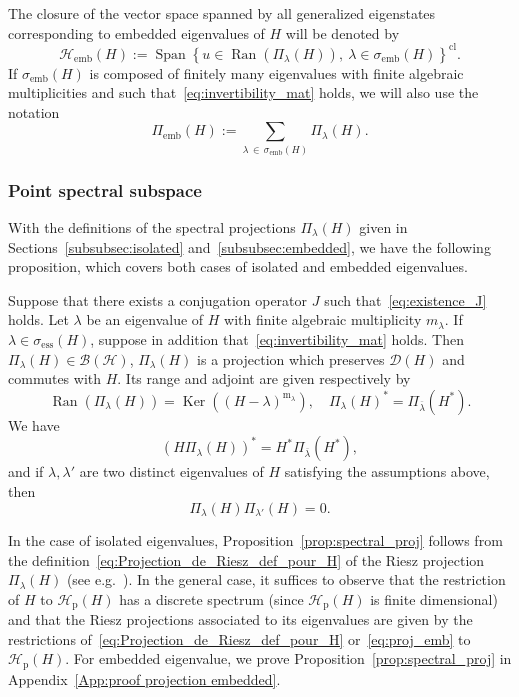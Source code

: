 \documentclass[AHL,Unicode,longabstracts,published]{cedram}
\newcommand{\Hi}{\mathcal{H}}
\newcommand{\ess}{\mathrm{ess}}
\newcommand{\rmp}{\mathrm{p}}
\newcommand{\rmm}{\mathrm{m}}
\newcommand{\clB}{\mathcal{B}}
\newcommand{\clD}{\mathcal{D}}
\DeclareMathOperator{\Ran}{Ran}
\DeclareMathOperator{\Ker}{Ker}
\DeclareMathOperator{\Span}{Span}
\newcommand{\Hi}{\mathcal{H}}
\newcommand{\rmp}{\mathrm{p}}
\newcommand{\ess}{\mathrm{ess}}
\begin{document}
The closure of the vector space spanned by all generalized eigenstates corresponding to embedded eigenvalues of $H$ will be denoted by
\begin{equation*}
\Hi_{\mathrm{emb}}(H):=\Span\left\lbrace u\in\Ran(\Pi_\lambda(H)),~\lambda\in\sigma_\mathrm{emb}(H)\right\rbrace^{\mathrm{cl}}.
\end{equation*}
If $\sigma_{\mathrm{emb}}(H)$ is composed of finitely many eigenvalues with finite algebraic multiplicities and such that~\eqref{eq:invertibility_mat} holds, we will also use the notation
\begin{equation*}
\Pi_{\mathrm{emb}}(H):=\sum_{\lambda\,\in\,\sigma_{\mathrm{emb}}(H)}\Pi_\lambda(H).
\end{equation*}

\subsubsection{Point spectral subspace}
With the definitions of the spectral projections $\Pi_\lambda(H)$ given in Sections~\ref{subsubsec:isolated} and~\ref{subsubsec:embedded}, we have the following proposition, which covers both cases of isolated and embedded eigenvalues.

\begin{prop}\label{prop:spectral_proj}
Suppose that there exists a conjugation operator $J$ such that~\eqref{eq:existence_J} holds. Let $\lambda$ be an eigenvalue of $H$ with finite algebraic multiplicity $m_\lambda$. If $\lambda\in\sigma_{\ess}(H)$, suppose in addition that~\eqref{eq:invertibility_mat} holds. Then $\Pi_\lambda(H)\in\clB(\Hi)$, $\Pi_\lambda(H)$ is a projection which preserves $\clD(H)$ and commutes with $H$. Its range and adjoint are given respectively by
\begin{equation*}
\Ran(\Pi_\lambda(H)) = \Ker((H-\lambda)^{\rmm_\lambda}), \quad \Pi_{\lambda}(H)^*=\Pi_{\overline{\lambda}}(H^*).
\end{equation*}
We have
\begin{equation*}
\left(H\Pi_\lambda(H)\right)^*=H^*\Pi_{\overline{\lambda}}(H^*),
\end{equation*}
and if $\lambda,\lambda'$ are two distinct eigenvalues of $H$ satisfying the assumptions above, then
\begin{equation*}
\Pi_\lambda(H)\Pi_{\lambda'}(H)=0.
\end{equation*}
\end{prop}

In the case of isolated eigenvalues, Proposition~\ref{prop:spectral_proj} follows from the definition~\eqref{eq:Projection_de_Riesz_def_pour_H} of the Riesz projection $\Pi_\lambda(H)$ (see e.g.~\cite[Theorem~XII.5]{ReSi80_01}). In the general case, it suffices to observe that the restriction of $H$ to $\Hi_{\rmp}(H)$ has a discrete spectrum (since $\Hi_{\rmp}(H)$ is finite dimensional) and that the Riesz projections associated to its eigenvalues are given by the restrictions of~\eqref{eq:Projection_de_Riesz_def_pour_H} or~\eqref{eq:proj_emb} to $\Hi_{\rmp}(H)$. For embedded eigenvalue, we prove Proposition~\ref{prop:spectral_proj} in Appendix~\ref{App:proof projection embedded}.
\end{document}
